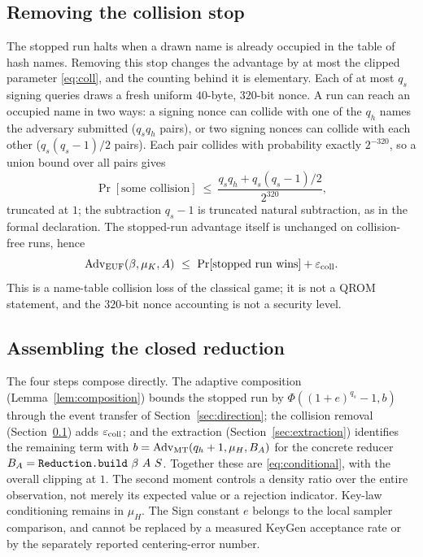 \subsection{Removing the collision stop}\label{sec:collstop}
The stopped run halts when a drawn name is already occupied in the
table of hash names. Removing this stop changes the advantage by at
most the clipped parameter \eqref{eq:coll}, and the counting behind it
is elementary. Each of at most $q_s$ signing queries draws a fresh
uniform $40$-byte, $320$-bit nonce. A run can reach an occupied name in
two ways: a signing nonce can collide with one of the $q_h$ names the
adversary submitted ($q_s q_h$ pairs), or two signing nonces can
collide with each other ($q_s(q_s-1)/2$ pairs). Each pair collides with
probability exactly $2^{-320}$, so a union bound over all pairs gives
\[
 \Pr[\text{some collision}]\ \leq\
 \frac{q_s q_h+q_s(q_s-1)/2}{2^{320}},
\]
truncated at $1$; the subtraction $q_s-1$ is truncated natural
subtraction, as in the formal declaration. The stopped-run advantage
itself is unchanged on collision-free runs, hence
\[
 \operatorname{Adv}_{\mathrm{EUF}}(\beta,\mu_K,A)
 \ \leq\ \Pr[\text{stopped run wins}]+\varepsilon_{\mathrm{coll}}.
\]
This is a name-table collision loss of the classical game; it is not a
QROM statement, and the $320$-bit nonce accounting is not a security
level.\src{C04,C05,C18}

\subsection{Assembling the closed reduction}
The four steps compose directly. The adaptive composition
(Lemma~\ref{lem:composition}) bounds the stopped run by
$\Phi((1+e)^{q_s}-1,b)$ through the event transfer of
Section~\ref{sec:direction}; the collision removal
(Section~\ref{sec:collstop}) adds $\varepsilon_{\mathrm{coll}}$; and the extraction
(Section~\ref{sec:extraction}) identifies the remaining term with
$b=\operatorname{Adv}_{\mathrm{MT}}(q_h+1,\mu_H,B_A)$ for the concrete reducer
$B_A=\code{Reduction.build}\ \beta\ A\ S$. Together these are
\eqref{eq:conditional}, with the overall clipping at $1$.
The second moment controls a density ratio over the entire observation,
not merely its expected value or a rejection indicator. Key-law
conditioning remains in $\mu_H$. The Sign constant $e$ belongs to the
local sampler comparison, and cannot be replaced by a measured KeyGen
acceptance rate or by the separately reported centering-error number.
\src{C01,C04,C06}
